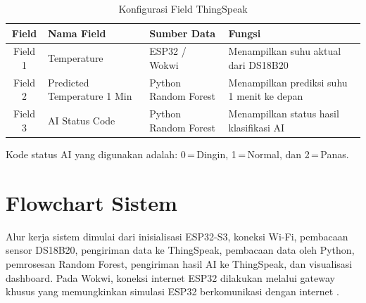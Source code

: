 \begin{table}[H]
\centering
\caption{Konfigurasi Field ThingSpeak}
\label{tab:thingspeak}
\begin{tabularx}{\textwidth}{c L{3.5cm} L{2.8cm} L{5.5cm}}
\toprule
\textbf{Field} & \textbf{Nama Field} & \textbf{Sumber Data} & \textbf{Fungsi} \\
\midrule
Field 1 & Temperature                 & ESP32 / Wokwi        & Menampilkan suhu aktual dari DS18B20 \\
Field 2 & Predicted Temperature 1 Min & Python Random Forest & Menampilkan prediksi suhu 1 menit ke depan \\
Field 3 & AI Status Code              & Python Random Forest & Menampilkan status hasil klasifikasi AI \\
\bottomrule
\end{tabularx}
\end{table}

Kode status AI yang digunakan adalah: 0\,=\,Dingin, 1\,=\,Normal, dan
2\,=\,Panas.

\section{Flowchart Sistem}

Alur kerja sistem dimulai dari inisialisasi ESP32-S3, koneksi Wi-Fi,
pembacaan sensor DS18B20, pengiriman data ke ThingSpeak, pembacaan data oleh
Python, pemrosesan Random Forest, pengiriman hasil AI ke ThingSpeak, dan
visualisasi dashboard. Pada Wokwi, koneksi internet ESP32 dilakukan melalui
gateway khusus yang memungkinkan simulasi ESP32 berkomunikasi dengan internet
\cite{wokwi_wifi}.

